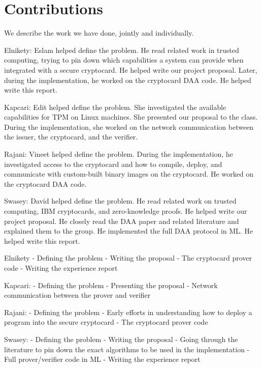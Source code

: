 \section{Contributions}

We describe the work we have done, jointly and individually.

Elnikety: Eslam helped define the problem.
He read related work in trusted computing, trying to pin down which capabilities a system can provide when integrated with a secure cryptocard.
He helped write our project proposal.
Later, during the implementation, he worked on the cryptocard DAA code.
He helped write this report.

Kapcari: Edit helped define the problem.
She investigated the available capabilities for TPM on Linux machines.
She presented our proposal to the class.
During the implementation, she worked on the network communication between the issuer, the cryptocard, and the verifier.

Rajani: Vineet helped define the problem.
During the implementation, he investigated access to the cryptocard and how to compile, deploy, and communicate with custom-built binary images on the cryptocard.
He worked on the cryptocard DAA code.

Swasey: David helped define the problem.
He read related work on trusted computing, IBM cryptocards, and zero-knowledge proofs.
He helped write our project proposal.
He closely read the DAA paper and related literature and explained them to the group.
He implemented the full DAA protocol in ML.
He helped write this report.


\begin{comment}
	\emph{EE:} Aniket’s Summary of Contributions (no hosing)
\end{comment}

Elnikety
- Defining the problem
- Writing the proposal
- The cryptocard prover code
- Writing the experience report

Kapcari:
- Defining the problem
- Presenting the proposal
- Network communication between the prover and verifier

Rajani:
- Defining the problem
- Early efforts in understanding how to deploy a program into the secure
cryptocard
- The cryptocard prover code 

Swasey:
- Defining the problem
- Writing the proposal
- Going through the literature to pin down the exact algorithms to be used in
the implementation
- Full prover/verifier code in ML
- Writing the experience report

\fi